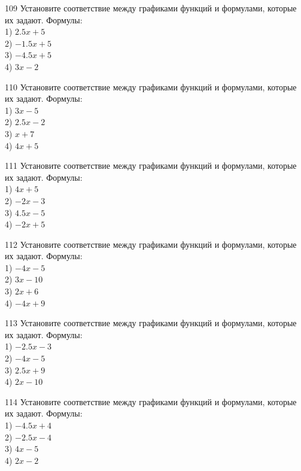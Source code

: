 \documentclass[4apaper]{article}
\begin{document}
\begin{taskBN}{109}
Установите соответствие между графиками функций и формулами, которые их задают. Формулы: \\1) $2.5x+5$\\2) $-1.5x+5$\\3) $-4.5x+5$\\4) $3x-2$
\end{taskBN}

\begin{taskBN}{110}
Установите соответствие между графиками функций и формулами, которые их задают. Формулы: \\1) $3x-5$\\2) $2.5x-2$\\3) $x+7$\\4) $4x+5$
\end{taskBN}

\begin{taskBN}{111}
Установите соответствие между графиками функций и формулами, которые их задают. Формулы: \\1) $4x+5$\\2) $-2x-3$\\3) $4.5x-5$\\4) $-2x+5$
\end{taskBN}

\begin{taskBN}{112}
Установите соответствие между графиками функций и формулами, которые их задают. Формулы: \\1) $-4x-5$\\2) $3x-10$\\3) $2x+6$\\4) $-4x+9$
\end{taskBN}

\begin{taskBN}{113}
Установите соответствие между графиками функций и формулами, которые их задают. Формулы: \\1) $-2.5x-3$\\2) $-4x-5$\\3) $2.5x+9$\\4) $2x-10$
\end{taskBN}

\begin{taskBN}{114}
Установите соответствие между графиками функций и формулами, которые их задают. Формулы: \\1) $-4.5x+4$\\2) $-2.5x-4$\\3) $4x-5$\\4) $2x-2$
\end{taskBN}
\end{document}
